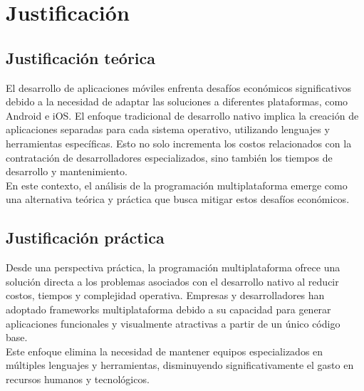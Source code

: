 \newpage
\section{Justificación}

\subsection{Justificación teórica}
El desarrollo de aplicaciones móviles enfrenta desafíos económicos
significativos debido a la necesidad de adaptar las soluciones a diferentes
plataformas, como Android e iOS. El enfoque tradicional de desarrollo nativo
implica la creación de aplicaciones separadas para cada sistema operativo,
utilizando lenguajes y herramientas específicas. Esto no solo incrementa los
costos relacionados con la contratación de desarrolladores especializados, sino
también los tiempos de desarrollo y mantenimiento.\\

En este contexto, el análisis de la programación multiplataforma emerge como
una alternativa teórica y práctica que busca mitigar estos desafíos
económicos.\\


\subsection{Justificación práctica}
Desde una perspectiva práctica, la programación multiplataforma ofrece
una solución directa a los problemas asociados con el desarrollo nativo
al reducir costos, tiempos y complejidad operativa. Empresas y
desarrolladores han adoptado frameworks multiplataforma debido a su
capacidad para generar aplicaciones funcionales y visualmente
atractivas a partir de un único código base.\\

Este enfoque elimina la necesidad de mantener equipos especializados
en múltiples lenguajes y herramientas, disminuyendo significativamente
el gasto en recursos humanos y tecnológicos.
